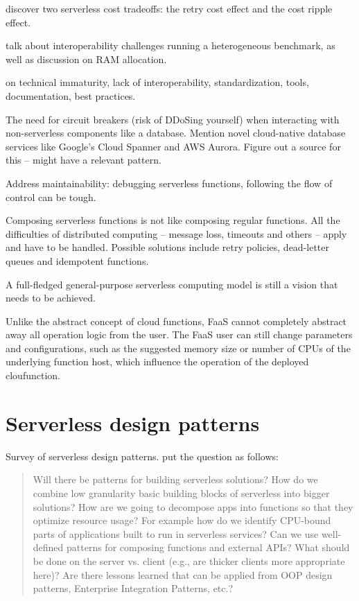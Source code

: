 \documentclass[utf8,english]{gradu3}
\begin{document}
\textcite{kuhlenkamp17costradamus} discover two serverless cost tradeoffs: the retry cost effect and the cost ripple effect.

\textcite{malawski18benchmark} talk about interoperability challenges running a heterogeneous benchmark, as well as discussion on RAM allocation.

\textcite{cncf18serverlessWG} on technical immaturity, lack of interoperability, standardization, tools, documentation, best practices.

The need for circuit breakers (risk of DDoSing yourself) when interacting with non-serverless components like a database. Mention novel cloud-native database services like Google's Cloud Spanner and AWS Aurora. Figure out a source for this -- \textcite{hohpe2004enterprise} might have a relevant pattern.

Address maintainability: debugging serverless functions, following the flow of control can be tough.

Composing serverless functions is not like composing regular functions. All the difficulties of distributed computing -- message loss, timeouts and others -- apply and have to be handled. Possible solutions include retry policies, dead-letter queues and idempotent functions.

A full-fledged general-purpose serverless computing model is still a vision that needs to be achieved. \parencite{buyya2017manifesto}

Unlike the abstract concept of cloud functions, FaaS cannot completely abstract away all operation logic from the user. The FaaS user can still change parameters and configurations, such as the suggested memory size or number of CPUs of the underlying function host, which influence the operation of the deployed cloufunction. \parencite{van2017spec}

\chapter{Serverless design patterns}

Survey of serverless design patterns. \textcite{baldini17currentTrends} put the question as follows:

\begin{quote}
Will there be patterns for building serverless solutions? How do we combine low granularity basic building blocks of serverless into bigger solutions? How are we going to decompose apps into functions so that they optimize resource usage? For example how do we identify CPU-bound parts of applications built to run in serverless services? Can we use well-defined patterns for composing functions and external APIs? What should be done on the server vs. client (e.g., are thicker clients more appropriate here)? Are there lessons learned that can be applied from OOP design patterns, Enterprise Integration Patterns, etc.?
\end{quote}
\end{document}
